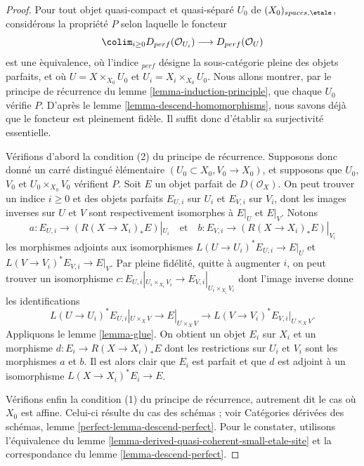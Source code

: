 \begin{proof}
Pour tout objet quasi-compact et quasi-s\'epar\'e $U_0$ de
$(X_0)_{spaces,\etale}$, consid\'erons la propri\'et\'e $P$ selon laquelle le
foncteur
$$
\colim_{i \geq 0} D_{perf}(\mathcal{O}_{U_i})
\longrightarrow
D_{perf}(\mathcal{O}_U)
$$
est une \`equivalence, o\`u l'indice ${}_{perf}$ d\'esigne la sous-cat\'egorie
pleine des objets parfaits, et o\`u $U=X\times_{X_0}U_0$ et
$U_i=X_i\times_{X_0}U_0$. Nous allons montrer, par le principe de r\'ecurrence
du lemme \ref{lemma-induction-principle}, que chaque $U_0$ v\'erifie $P$.
D'apr\`es le lemme \ref{lemma-descend-homomorphisms}, nous savons d\'ej\`a que
le foncteur est pleinement fid\`ele. Il suffit donc d'\'etablir sa surjectivit\'e
essentielle.

\medskip\noindent
V\'erifions d'abord la condition (2) du principe de r\'ecurrence. Supposons donc
donn\'e un carr\'e distingu\'e \`el\'ementaire
$(U_0\subset X_0,V_0\to X_0)$, et supposons que $U_0$, $V_0$ et
$U_0\times_{X_0}V_0$ v\'erifient $P$. Soit $E$ un objet parfait de
$D(\mathcal{O}_X)$. On peut trouver un indice $i\geq0$ et des objets parfaits
$E_{U,i}$ sur $U_i$ et $E_{V,i}$ sur $V_i$, dont les images inverses sur $U$
et $V$ sont respectivement isomorphes \`a $E|_U$ et $E|_V$. Notons
$$
a : E_{U, i} \to (R(X \to X_i)_*E)|_{U_i}
\quad\text{et}\quad
b : E_{V, i} \to (R(X \to X_i)_*E)|_{V_i}
$$
les morphismes adjoints aux isomorphismes
$L(U\to U_i)^*E_{U,i}\to E|_U$ et
$L(V\to V_i)^*E_{V,i}\to E|_V$. Par pleine fid\'elit\'e, quitte \`a augmenter
$i$, on peut trouver un isomorphisme
$c:E_{U,i}|_{U_i\times_{X_i}V_i}\to
E_{V,i}|_{U_i\times_{X_i}V_i}$ dont l'image inverse donne les identifications
$$
L(U \to U_i)^*E_{U, i}|_{U \times_X V} \to E|_{U \times_X V} \to
L(V \to V_i)^*E_{V, i}|_{U \times_X V}.
$$
Appliquons le lemme \ref{lemma-glue}. On obtient un objet $E_i$ sur $X_i$ et
un morphisme $d:E_i\to R(X\to X_i)_*E$ dont les restrictions sur $U_i$ et
$V_i$ sont les morphismes $a$ et $b$. Il est alors clair que $E_i$ est parfait
et que $d$ est adjoint \`a un isomorphisme $L(X\to X_i)^*E_i\to E$.

\medskip\noindent
V\'erifions enfin la condition (1) du principe de r\'ecurrence, autrement dit
le cas o\`u $X_0$ est affine. Celui-ci r\'esulte du cas des sch\'emas ; voir
Cat\'egories d\'eriv\'ees des sch\'emas, lemme
\ref{perfect-lemma-descend-perfect}. Pour le constater, utilisons
l'\'equivalence du lemme \ref{lemma-derived-quasi-coherent-small-etale-site}
et la correspondance du lemme \ref{lemma-descend-perfect}.
\end{proof}

